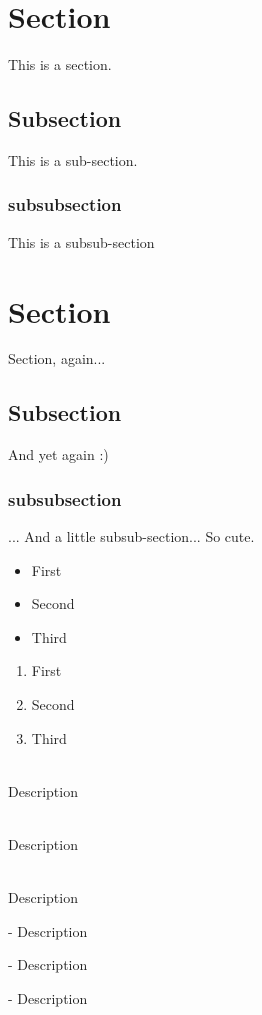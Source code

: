 \documentclass[a4paper,11pt,danish,oneside]{article}
\begin{document}
\missingfigure

\section*{Section}
This is a section.
\subsection*{Subsection}
This is a sub-section.
\subsubsection*{subsubsection}
This is a subsub-section
\section{Section}
Section, again...
\subsection{Subsection}
And yet again :)
\subsubsection{subsubsection}
... And a little subsub-section... So cute.
{
    \begin{itemize}
    	\item First
    	\item Second
    	\item Third
    \end{itemize}
}

{
	\begin{enumerate}
		\item First
		\item Second
		\item Third
	\end{enumerate}
}

\begin{description}
	\item [First]\hfill \\  Description 
	\item [Second]\hfill \\  Description
	\item [Third]\hfill \\ Description
\end{description}

\begin{description}
	\item [First] -  Description 
	\item [Second] -  Description
	\item [Third] - Description
\end{description}
\end{document}
